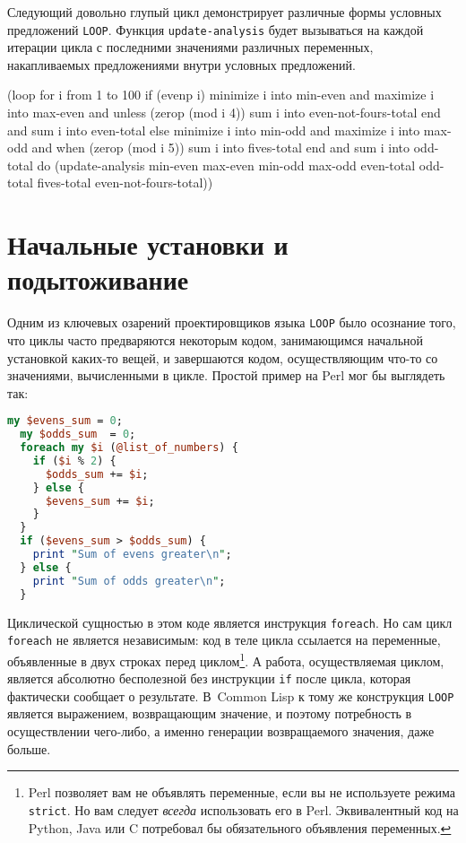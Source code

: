 Следующий довольно глупый цикл демонстрирует различные формы условных предложений
\lstinline{LOOP}. Функция \lstinline{update-analysis} будет вызываться на каждой итерации цикла с
последними значениями различных переменных, накапливаемых пред\-ло\-же\-ния\-ми внутри условных
предложений.

\begin{myverb}
(loop for i from 1 to 100
      if (evenp i)
        minimize i into min-even and 
        maximize i into max-even and
        unless (zerop (mod i 4))
          sum i into even-not-fours-total
        end
        and sum i into even-total
      else
        minimize i into min-odd and
        maximize i into max-odd and
        when (zerop (mod i 5)) 
          sum i into fives-total
        end
        and sum i into odd-total
      do (update-analysis min-even
                          max-even
                          min-odd
                          max-odd
                          even-total
                          odd-total
                          fives-total
                          even-not-fours-total))
\end{myverb}

\section{Начальные установки и подытоживание}

Одним из ключевых озарений проектировщиков языка \lstinline{LOOP} было осознание того, что
циклы часто предваряются некоторым кодом, занимающимся начальной установкой каких-то
вещей, и завершаются кодом, осуществляющим что-то со значениями, вычисленными в
цикле. Простой пример на Perl мог бы
выглядеть так:

\begin{lstlisting}[language=Perl]
my $evens_sum = 0;
  my $odds_sum  = 0;
  foreach my $i (@list_of_numbers) {
    if ($i % 2) {
      $odds_sum += $i;
    } else {
      $evens_sum += $i;
    }
  }
  if ($evens_sum > $odds_sum) {
    print "Sum of evens greater\n";
  } else {
    print "Sum of odds greater\n";
  }
\end{lstlisting}

Циклической сущностью в этом коде является инструкция \lstinline{foreach}. Но сам цикл
\lstinline{foreach} не является независимым: код в теле цикла ссылается на переменные,
объявленные в двух строках перед циклом\footnote{Perl позволяет вам не объявлять
  переменные, если вы не используете режима \lstinline{strict}. Но вам следует \textit{всегда}
  использовать его в Perl. Эквивалентный код на Python, Java или C потребовал бы
  обязательного объявления переменных.}\hspace{\footnotenegspace}. А работа, осуществляемая циклом, является
абсолютно бесполезной без инструкции \lstinline{if} после цикла, которая фактически сообщает о
результате. В~Common Lisp к тому же конструкция \lstinline{LOOP} является выражением,
возвращающим значение, и поэтому потребность в осуществлении чего-либо, а именно генерации
возвращаемого значения, даже больше.

